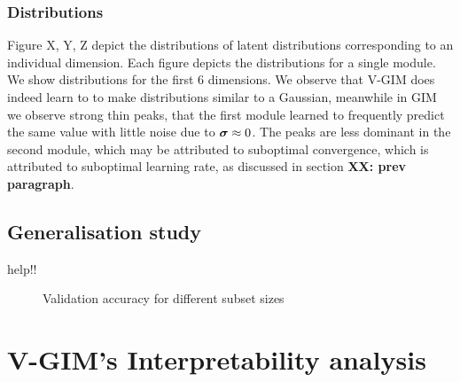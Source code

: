 		
		
		
	\subsubsection{Distributions}
		Figure X, Y, Z depict the distributions of latent distributions corresponding to an individual dimension. Each figure depicts the distributions for a single module. We show distributions for the first 6 dimensions. We observe that V-GIM does indeed learn to to make distributions similar to a Gaussian, meanwhile in GIM we observe strong thin peaks, that the first module learned to frequently predict the same value with little noise due to $\bm{\sigma} \approx 0$. The peaks are less dominant in the second module, which may be attributed to suboptimal convergence, which is attributed to suboptimal learning rate, as discussed in section \textbf{XX: prev paragraph}.
		


	\subsection{Generalisation study}
		help!!
		
		\begin{figure}[h] %
			\centering
			\begin{subfigure}[b]{0.4\textwidth}
				\centering
				
			\end{subfigure}
			\hfill
			\begin{subfigure}[b]{0.4\textwidth}
				\centering
				
			\end{subfigure}
			\caption{Validation accuracy for different subset sizes}
		\end{figure}






	


\section{V-GIM's Interpretability analysis}


